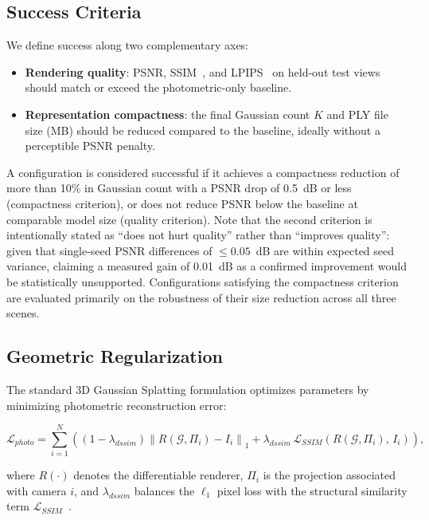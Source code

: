 \subsection{Success Criteria}

We define success along two complementary axes:
\begin{itemize}
    \item \textbf{Rendering quality}: PSNR, SSIM~\cite{wang2004ssim}, and LPIPS~\cite{zhang2018lpips} on held-out test views should match or exceed the photometric-only baseline.
    \item \textbf{Representation compactness}: the final Gaussian count $K$ and PLY file size (MB) should be reduced compared to the baseline, ideally without a perceptible PSNR penalty.
\end{itemize}

A configuration is considered successful if it achieves a compactness reduction of more than 10\% in Gaussian count with a PSNR drop of 0.5~dB or less (compactness criterion), or does not reduce PSNR below the baseline at comparable model size (quality criterion). Note that the second criterion is intentionally stated as ``does not hurt quality'' rather than ``improves quality'': given that single-seed PSNR differences of $\leq 0.05$~dB are within expected seed variance, claiming a measured gain of 0.01~dB as a confirmed improvement would be statistically unsupported. Configurations satisfying the compactness criterion are evaluated primarily on the robustness of their size reduction across all three scenes.

\subsection{Geometric Regularization}

The standard 3D Gaussian Splatting formulation optimizes parameters by minimizing photometric reconstruction error:

\begin{equation}
\mathcal{L}_{photo} =
\sum_{i=1}^{N}
\left(
(1 - \lambda_{dssim})\left\| R(\mathcal{G}, \Pi_i) - I_i \right\|_1
+ \lambda_{dssim}\,\mathcal{L}_{SSIM}\!\left(R(\mathcal{G}, \Pi_i),\, I_i\right)
\right),
\end{equation}

where $R(\cdot)$ denotes the differentiable renderer, $\Pi_i$ is the projection associated with camera $i$, and $\lambda_{dssim}$ balances the $\ell_1$ pixel loss with the structural similarity term $\mathcal{L}_{SSIM}$~\cite{wang2004ssim}.

